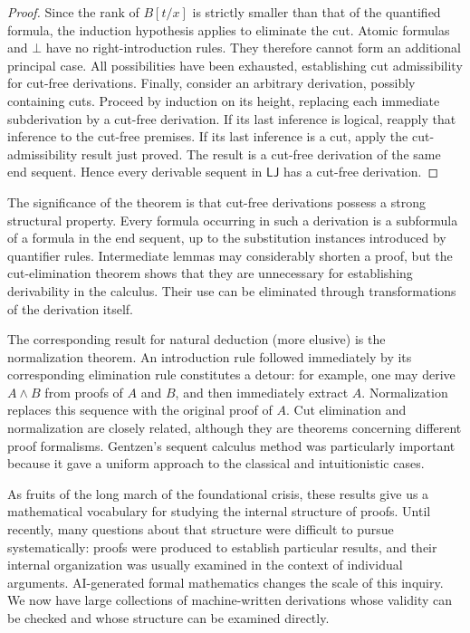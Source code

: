 \documentclass{article}
\begin{document}
\begin{proof}
Since the rank of $B[t/x]$ is strictly smaller than that of the quantified formula, the induction hypothesis applies to 
eliminate the cut.
Atomic formulas and $\bot$ have no right-introduction rules. They therefore cannot form an additional principal case. 
All possibilities have been exhausted, establishing cut admissibility for cut-free derivations.
Finally, consider an arbitrary derivation, possibly containing cuts. Proceed by induction on its height, replacing 
each immediate subderivation by a cut-free derivation. If its last inference is logical, reapply that inference to the 
cut-free premises. If its last inference is a cut, apply the cut-admissibility result just proved. The result is a cut-free 
derivation of the same end sequent. Hence every derivable sequent in $\mathsf{LJ}$ has a cut-free derivation.
\end{proof}

The significance of the theorem is that cut-free derivations possess a strong structural property. Every formula occurring 
in such a derivation is a subformula of a formula in the end sequent, up to the substitution instances introduced by 
quantifier rules. Intermediate lemmas may considerably shorten a proof, but the cut-elimination theorem shows that they 
are unnecessary for establishing derivability in the calculus. Their use can be eliminated through transformations of 
the derivation itself.

The corresponding result for natural deduction (more elusive) is the normalization theorem. An introduction rule followed immediately 
by its corresponding elimination rule constitutes a detour: for example, one may derive $A\land B$ from proofs of $A$ 
and $B$, and then immediately extract $A$. Normalization replaces this sequence with the original proof of $A$. Cut 
elimination and normalization are closely related, although they are theorems concerning different proof formalisms. 
Gentzen's sequent calculus method was particularly important because it gave a uniform approach to the classical and 
intuitionistic cases.

As fruits of the long march of the foundational crisis, these results give us a mathematical vocabulary for studying the internal structure of proofs. Until recently, many 
questions about that structure were difficult to pursue systematically: proofs were produced to establish particular 
results, and their internal organization was usually examined in the context of individual arguments. AI-generated 
formal mathematics changes the scale of this inquiry. We now have large collections of machine-written derivations 
whose validity can be checked and whose structure can be examined directly.
\end{document}
